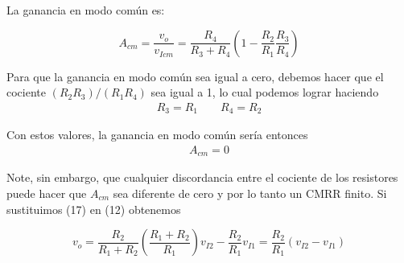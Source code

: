 \documentclass[12pt]{article}
\begin{document}
	\noindent La ganancia en modo común es:
	\begin{tcolorbox}[colback=red!5!white,colframe=red!75!black,arc=0mm,boxrule=0mm,width=(\linewidth+0.5cm)]
		\begin{equation}
			A_{cm} = \frac{v_o}{v_{Icm}} = \frac{R_4}{R_3 + R_4}\left( 1 - \frac{R_2}{R_1} \frac{R_3}{R_4} \right)
		\end{equation}
	\end{tcolorbox}
	
	\noindent Para que la ganancia en modo común sea igual a cero, debemos hacer que el cociente $(R_2R_3)/(R_1R_4)$ sea igual a 1, lo cual podemos lograr haciendo
	\begin{align}
		R_3 = R_1 \quad \quad R_4 = R_2
	\end{align}
	
	\noindent Con estos valores, la ganancia en modo común sería entonces
	\begin{align}
		A_{cm} = 0
	\end{align}
	
	Note, sin embargo, que cualquier discordancia entre el cociente de los resistores puede hacer que $A_{cm}$ sea diferente de cero y por lo tanto un CMRR finito. Si sustituimos (17) en (12) obtenemos
	\begin{tcolorbox}[colback=red!5!white,colframe=red!75!black,arc=0mm,boxrule=0mm,width=(\linewidth+0.5cm)]
		\begin{equation}
			v_o = \frac{R_2}{R_1 + R_2}\left( \frac{R_1 + R_2}{R_1} \right)v_{I2} - \frac{R_2}{R_1}v_{I1} = \frac{R_2}{R_1} \left( v_{I2} - v_{I1} \right)
		\end{equation}
	\end{tcolorbox}	
\end{document}
